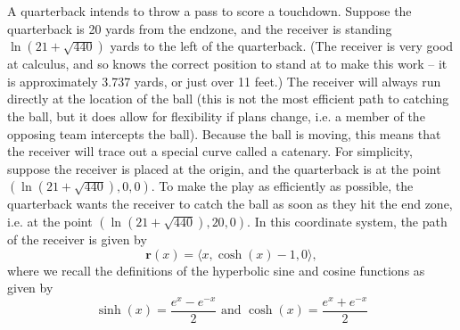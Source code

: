 \documentclass[12pt]{exam}
\begin{document}
\begin{questions}
\clearpage
\question A quarterback intends to throw a pass to score a touchdown. Suppose the quarterback is 20 yards from
	the endzone, and the receiver is standing $\ln (21 + \sqrt{440})$ yards to the left of the quarterback. (The
	receiver is very good at calculus, and so knows the correct position to stand at to make this work -- it is
	approximately 3.737 yards, or just over 11 feet.) The receiver will always run directly at the location of
	the ball (this is not the most efficient path to catching the ball, but it does allow for flexibility if plans
	change, i.e. a member of the opposing team intercepts the ball). Because the ball is moving, this means
	that the receiver will trace out a special curve called a catenary. For simplicity, suppose the receiver
	is placed at the origin, and the quarterback is at the point $(\ln (21 + \sqrt{440}) , 0, 0)$. To make the play
	as efficiently as possible, the quarterback wants the receiver to catch the ball as soon as they hit the
	end zone, i.e. at the point $(\ln (21 + \sqrt{440}) , 20, 0)$. In this coordinate system, the path of the receiver is given by
	\[ \mathbf{r}(x) = \langle x, \cosh(x) - 1, 0 \rangle, \]
	where we recall the definitions of the hyperbolic sine and cosine functions as given by
	\[\sinh(x) = \frac{e^x-e^{-x}}{2} \text{ and } \cosh(x) = \frac{e^x + e^{-x}}{2}\]
	\begin{parts}

\end{parts}
\end{questions}
\end{document}
